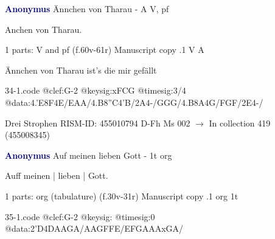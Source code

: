 \documentclass[twocolumn]{book}
\begin{document}
\newline \par \vspace{7pt} \textcolor{darkblue}{\textbf{Anonymus  }}
\newline Ännchen von Tharau - A
\newline V, pf
\newline \begin{itshape}[heading, f.60v:] Anchen von Tharau.\end{itshape} 
\newline \textcolor{darkblue}{}  1 parts: V and pf  (f.60v-61r)
\newline Manuscript copy
.1  V  A
\newline \begin{footnotesize} Ännchen von Tharau ist's die mir gefällt \end{footnotesize}  
\begin{filecontents*}{34-1.code}
@clef:G-2
@keysig:xFCG
@timesig:3/4
@data:4.'E8F4E/EAA/4.B8''C4'B/2A4-/GGG/4.B8A4G/FGF/2E4-/
\end{filecontents*}
\newline
%

\newline Drei Strophen
\newline RISM-ID: 455010794
\newline D-Fh  Ms 002
\newline $\rightarrow$ In collection 419 (455008345)
      
\newline \par \vspace{7pt} \textcolor{darkblue}{\textbf{Anonymus  }}
\newline Auf meinen lieben Gott - 1t
\newline org
\newline \begin{itshape}[f.30v, at left:] Auff meinen | lieben | Gott.\end{itshape} 
\newline \textcolor{darkblue}{}  1 parts: org (tabulature)  (f.30v-31r)
\newline Manuscript copy
.1  org  1t  
\begin{filecontents*}{35-1.code}
@clef:G-2
@keysig:
@timesig:0
@data:2'D4DAAGA/AAGFFE/EFGAAAxGA/
\end{filecontents*}
\newline
%
\end{document}
